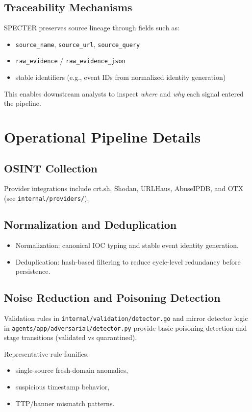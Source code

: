 \documentclass[11pt,a4paper]{article}
\begin{document}
\subsection{Traceability Mechanisms}
SPECTER preserves source lineage through fields such as:
\begin{itemize}[leftmargin=1.5em]
    \item \texttt{source\_name}, \texttt{source\_url}, \texttt{source\_query}
    \item \texttt{raw\_evidence} / \texttt{raw\_evidence\_json}
    \item stable identifiers (e.g., event IDs from normalized identity generation)
\end{itemize}
This enables downstream analysts to inspect \emph{where} and \emph{why} each signal entered the pipeline.

\section{Operational Pipeline Details}

\subsection{OSINT Collection}
Provider integrations include crt.sh, Shodan, URLHaus, AbuseIPDB, and OTX (see \texttt{internal/providers/}).

\subsection{Normalization and Deduplication}
\begin{itemize}[leftmargin=1.5em]
    \item Normalization: canonical IOC typing and stable event identity generation.
    \item Deduplication: hash-based filtering to reduce cycle-level redundancy before persistence.
\end{itemize}

\subsection{Noise Reduction and Poisoning Detection}
Validation rules in \texttt{internal/validation/detector.go} and mirror detector logic in \texttt{agents/app/adversarial/detector.py} provide basic poisoning detection and stage transitions (validated vs quarantined).

Representative rule families:
\begin{itemize}[leftmargin=1.5em]
    \item single-source fresh-domain anomalies,
    \item suspicious timestamp behavior,
    \item TTP/banner mismatch patterns.
\end{itemize}
\end{document}
